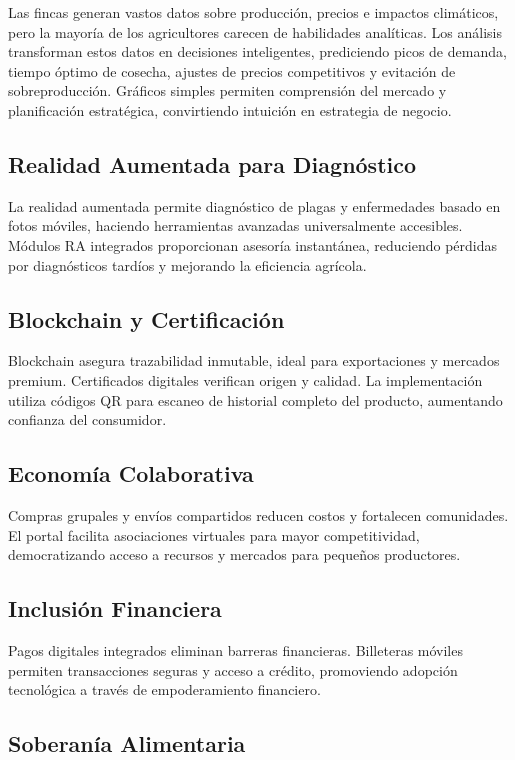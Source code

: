 Las fincas generan vastos datos sobre producción, precios e impactos climáticos, pero la mayoría de los agricultores carecen de habilidades analíticas. Los análisis transforman estos datos en decisiones inteligentes, prediciendo picos de demanda, tiempo óptimo de cosecha, ajustes de precios competitivos y evitación de sobreproducción. Gráficos simples permiten comprensión del mercado y planificación estratégica, convirtiendo intuición en estrategia de negocio.
\subsection{Realidad Aumentada para Diagnóstico}

La realidad aumentada permite diagnóstico de plagas y enfermedades basado en fotos móviles, haciendo herramientas avanzadas universalmente accesibles. Módulos RA integrados proporcionan asesoría instantánea, reduciendo pérdidas por diagnósticos tardíos y mejorando la eficiencia agrícola.
\subsection{Blockchain y Certificación}

Blockchain asegura trazabilidad inmutable, ideal para exportaciones y mercados premium. Certificados digitales verifican origen y calidad. La implementación utiliza códigos QR para escaneo de historial completo del producto, aumentando confianza del consumidor.
\subsection{Economía Colaborativa}

Compras grupales y envíos compartidos reducen costos y fortalecen comunidades. El portal facilita asociaciones virtuales para mayor competitividad, democratizando acceso a recursos y mercados para pequeños productores.
\subsection{Inclusión Financiera}

Pagos digitales integrados eliminan barreras financieras. Billeteras móviles permiten transacciones seguras y acceso a crédito, promoviendo adopción tecnológica a través de empoderamiento financiero.
\subsection{Soberanía Alimentaria}

